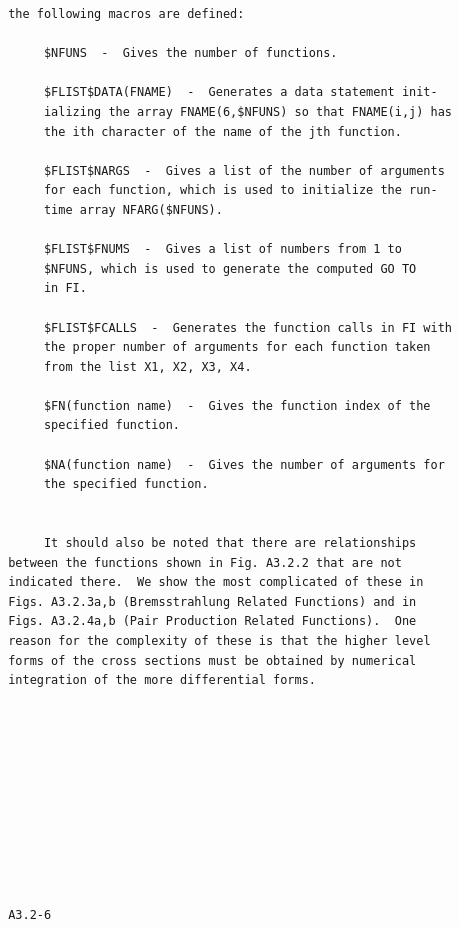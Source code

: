 \newpage {} \begin{verbatim}
 the following macros are defined:
 
      $NFUNS  -  Gives the number of functions.
 
      $FLIST$DATA(FNAME)  -  Generates a data statement init-
      ializing the array FNAME(6,$NFUNS) so that FNAME(i,j) has
      the ith character of the name of the jth function.
 
      $FLIST$NARGS  -  Gives a list of the number of arguments
      for each function, which is used to initialize the run-
      time array NFARG($NFUNS).
 
      $FLIST$FNUMS  -  Gives a list of numbers from 1 to
      $NFUNS, which is used to generate the computed GO TO
      in FI.
 
      $FLIST$FCALLS  -  Generates the function calls in FI with
      the proper number of arguments for each function taken
      from the list X1, X2, X3, X4.
 
      $FN(function name)  -  Gives the function index of the
      specified function.
 
      $NA(function name)  -  Gives the number of arguments for
      the specified function.
 
 
      It should also be noted that there are relationships
 between the functions shown in Fig. A3.2.2 that are not
 indicated there.  We show the most complicated of these in
 Figs. A3.2.3a,b (Bremsstrahlung Related Functions) and in
 Figs. A3.2.4a,b (Pair Production Related Functions).  One
 reason for the complexity of these is that the higher level
 forms of the cross sections must be obtained by numerical
 integration of the more differential forms.
 
 
 








 A3.2-6
\end{verbatim} 
\newpage {} 
